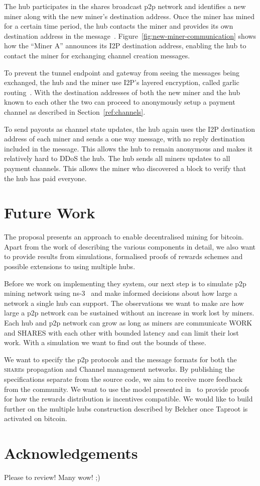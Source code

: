 \documentclass{article}
\begin{document}
The hub participates in the shares broadcast p2p network and
identifies a new miner along with the new miner's destination
address. Once the miner has mined for a certain time period, the hub
contacts the miner and provides its own destination address in the
message~\cite{i2p-streaming-library}. Figure~\ref{fig:new-miner-communication}
shows how the ``Miner A'' announces its I2P destination address,
enabling the hub to contact the miner for exchanging channel creation
messages.

To prevent the tunnel endpoint and gateway from seeing the messages
being exchanged, the hub and the miner use I2P's layered encryption,
called garlic routing~\cite{i2p-garlic-routing}. With the destination
addresses of both the new miner and the hub known to each other the
two can proceed to anonymously setup a payment channel as described in
Section~\ref{ref:channels}.

To send payouts as channel state updates, the hub again uses the I2P
destination address of each miner and sends a one way message, with no
reply destination included in the message. This allows the hub to
remain anonymous and makes it relatively hard to DDoS the hub. The hub
sends all miners updates to all payment channels. This allows the miner
who discovered a block to verify that the hub has paid everyone.

\section{Future Work}

The proposal presents an approach to enable decentralised mining for
bitcoin. Apart from the work of describing the various components in
detail, we also want to provide results from simulations, formalised
proofs of rewards schemes and possible extensions to using multiple
hubs.

Before we work on implementing they system, our next step is to
simulate p2p mining network using ns-3~\cite{ns3} and make informed
decisions about how large a network a single hub can support. The
observations we want to make are how large a p2p network can be
sustained without an increase in work lost by miners. Each hub and p2p
network can grow as long as miners are communicate WORK and SHARES
with each other with bounded latency and can limit their lost
work. With a simulation we want to find out the bounds of these.

We want to specify the p2p protocols and the message formats for both
the \textsc{share}s propagation and Channel management networks. By
publishing the specifications separate from the source code, we aim to
receive more feedback from the community. We want to use the model
presented in~\cite{incentives-compatible} to provide proofs for how
the rewards distribution is incentives compatible. We would like to
build further on the multiple hubs construction described by Belcher
once Taproot is activated on bitcoin.

\section{Acknowledgements}

Please to review! Many wow! ;)

 

\end{document}
